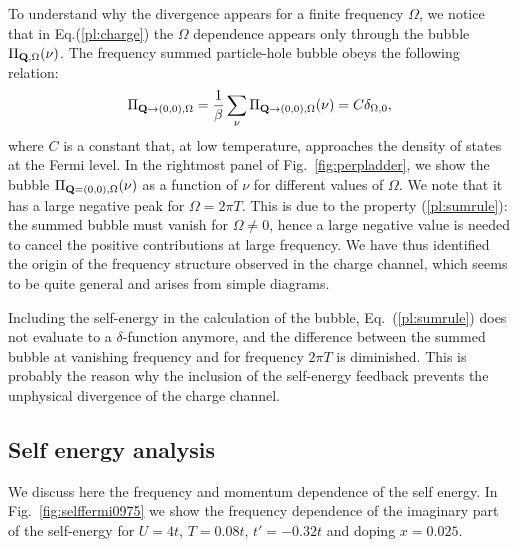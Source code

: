 To understand why the divergence appears for a finite frequency $\Omega$, we notice that in Eq.(\ref{pl:charge}) the $\Omega$ dependence 
appears only through the bubble $\Pi_{\mathbf{Q},\Omega}(\nu)$. The frequency summed particle-hole bubble obeys the following relation:  
\begin{equation}
 \Pi_{\mathbf{Q}\rightarrow(0,0),\Omega} = \frac{1}{\beta} \sum_{\nu}
 \Pi_{\mathbf{Q}\rightarrow(0,0),\Omega}(\nu) = C \delta_{\Omega,0},
\label{pl:sumrule}
\end{equation}
where $C$ is a constant that, at low temperature, approaches the density of states at the Fermi level.
In the rightmost panel of Fig.~\ref{fig:perpladder}, we show the bubble $\Pi_{\mathbf{Q}=(0,0),\Omega}(\nu)$ as a function of $\nu$ for different values of $\Omega$.
We note that it has a large negative peak for $\Omega=2\pi T$.
This is due to the property (\ref{pl:sumrule}): the summed 
bubble must vanish for $\Omega \neq 0$, hence a large negative value is needed to cancel the positive contributions at large frequency. 
We have thus identified the origin of the frequency structure observed in the charge channel, which seems to be quite general and arises from simple diagrams. 

Including the self-energy in the calculation of the bubble,   Eq.~(\ref{pl:sumrule}) does not evaluate to a $\delta$-function anymore, and the difference between the summed bubble at vanishing frequency and for frequency $2\pi T$ is diminished. 
This is probably the reason why the inclusion of the self-energy feedback prevents the unphysical divergence of the charge channel.     

\subsection{Self energy analysis}
We discuss here the frequency and momentum dependence of the self energy. 
In Fig.~\ref{fig:selffermi0975}  we show the frequency dependence of the imaginary part of the self-energy for $U=4t$, $T=0.08t$,  $t'=-0.32t$ and doping $x=0.025$. 

